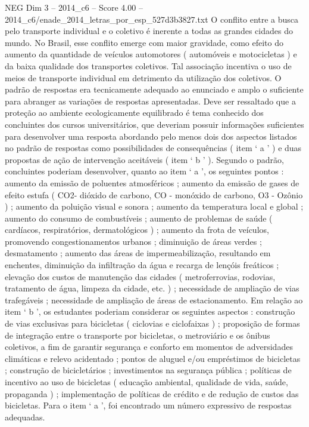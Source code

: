 \begin{textsample}{NEG Dim 3 – 2014\_c6 – Score 4.00 – 2014\_c6/enade\_2014\_letras\_por\_esp\_527d3b3827.txt}
O conflito entre a busca pelo transporte individual e o coletivo é inerente a todas as grandes cidades do mundo.
No Brasil, esse conflito emerge com maior gravidade, como efeito do aumento da quantidade de veículos automotores ( automóveis e motocicletas ) e da baixa qualidade dos transportes coletivos.
Tal associação incentiva o uso de meios de transporte individual em detrimento da utilização dos coletivos.
O padrão de respostas era tecnicamente adequado ao enunciado e amplo o suficiente para abranger as variações de respostas apresentadas.
Deve ser ressaltado que a proteção ao ambiente ecologicamente equilibrado é tema conhecido dos concluintes dos cursos universitários, que deveriam possuir informações suficientes para desenvolver uma resposta abordando pelo menos dois dos aspectos listados no padrão de respostas como possibilidades de consequências ( item ‘ a ’ ) e duas propostas de ação de intervenção aceitáveis ( item ‘ b ’ ).
Segundo o padrão, concluintes poderiam desenvolver, quanto ao item ‘ a ’, os seguintes pontos : aumento da emissão de poluentes atmosféricos ; aumento da emissão de gases de efeito estufa ( CO2- dióxido de carbono, CO - monóxido de carbono, O3 - Ozônio ) ; aumento da poluição visual e sonora ; aumento da temperatura local e global ; aumento do consumo de combustíveis ; aumento de problemas de saúde ( cardíacos, respiratórios, dermatológicos ) ; aumento da frota de veículos, promovendo congestionamentos urbanos ; diminuição de áreas verdes ; desmatamento ; aumento das áreas de impermeabilização, resultando em enchentes, diminuição da infiltração da água e recarga de lençóis freáticos ; elevação dos custos de manutenção das cidades ( metroferrovias, rodovias, tratamento de água, limpeza da cidade, etc. ) ; necessidade de ampliação de vias trafegáveis ; necessidade de ampliação de áreas de estacionamento.
Em relação ao item ‘ b ’, os estudantes poderiam considerar os seguintes aspectos : construção de vias exclusivas para bicicletas ( ciclovias e ciclofaixas ) ; proposição de formas de integração entre o transporte por bicicletas, o metroviário e os ônibus coletivos, a fim de garantir segurança e conforto em momentos de adversidades climáticas e relevo acidentado ; pontos de aluguel e/ou empréstimos de bicicletas ; construção de bicicletários ; investimentos na segurança pública ; políticas de incentivo ao uso de bicicletas ( educação ambiental, qualidade de vida, saúde, propaganda ) ; implementação de políticas de crédito e de redução de custos das bicicletas.
Para o item ‘ a ’, foi encontrado um número expressivo de respostas adequadas.

\end{textsample}
